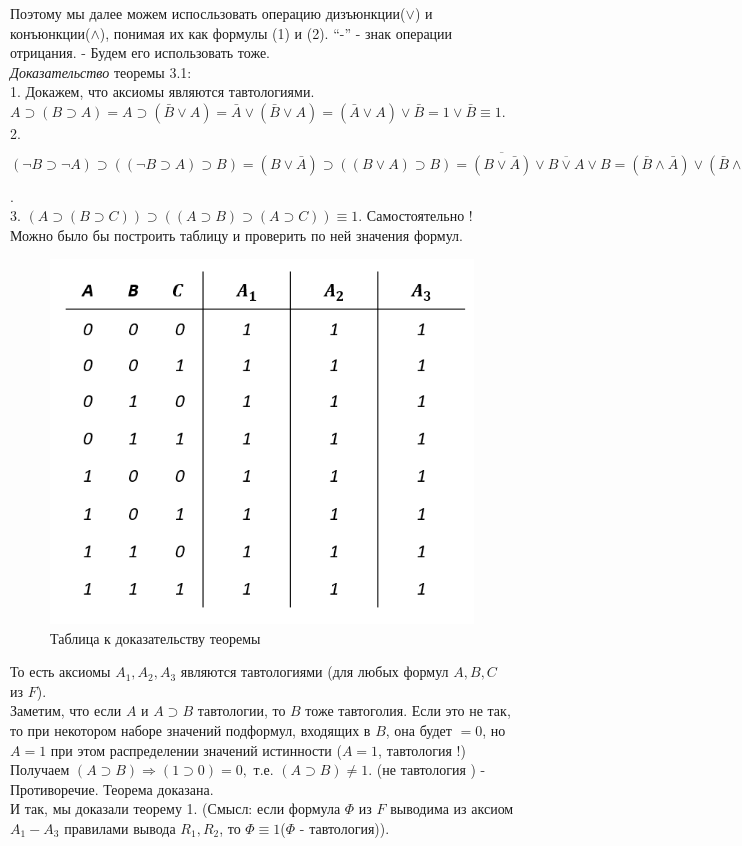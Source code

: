 \documentclass{article}
\numberwithin{example}{section}
\numberwithin{question}{section}
\numberwithin{Remark}{section}
\numberwithin{theorem}{section}
\numberwithin{definition}{section}
\numberwithin{proposition}{section}
\begin{document}
Поэтому мы далее можем испосльзовать операцию дизъюнкции($\lor$) и конъюнкции($\land$), понимая их как формулы (1) и (2). ``-'' - знак операции отрицания. - Будем его использовать тоже.\\
\emph{Доказательство} теоремы 3.1:\\
1. Докажем, что аксиомы являются тавтологиями.\\
$A\supset(B\supset A)=A\supset (\bar{B}\lor A)=\bar{A}\lor (\bar{B}\lor A)=(\bar{A} \lor A) \lor \bar{B}=1\lor \bar{B}\equiv 1$.\\
2. $(\lnot B\supset \lnot A)\supset ((\lnot B\supset A)\supset B)=(B\lor \bar{A})\supset ((B\lor A)\supset B)=\overline{(B\lor \bar{A})}\lor \overline{B\lor A}\lor B=(\bar{B}\land \bar{A})\lor (\bar{B}\land A)\lor B=\bar{B}(\underbrace{\bar{A}\lor A}_{=1})\lor B=\bar{B}\lor B\equiv 1$.\\
3. $(A\supset (B\supset C))\supset ((A\supset B)\supset (A\supset C))\equiv 1$. Самостоятельно !\\
Можно было бы построить таблицу и проверить по ней значения формул.
\begin{figure}[!htpb]
	\centering
	\includegraphics[width=0.5\linewidth]{3-6}
	\caption{Таблица к доказательству теоремы}
	\label{fig:3-6}
\end{figure}
То есть аксиомы $A_1,A_2,A_3$ являются тавтологиями (для любых формул $A,B,C$ из $F$). \\
Заметим, что если $A$ и $A\supset B$ тавтологии, то $B$ тоже тавтоголия. Если это не так, то при некотором наборе значений подформул, входящих в $B$, она будет $=0$, но $A=1$ при этом распределении значений истинности ($A=1$, тавтология !) Получаем $(A\supset B)\Rightarrow (1\supset 0)=0,$ т.е. $(A\supset B)\ne 1$. (не тавтология ) - Противоречие. Теорема доказана.\\
И так, мы доказали теорему 1. (Смысл: если формула $\Phi$ из $F$ выводима из аксиом $A_1 - A_3$ правилами вывода $R_1,R_2$, то $\Phi\equiv 1$($\Phi$ - тавтология)).
\end{document}
